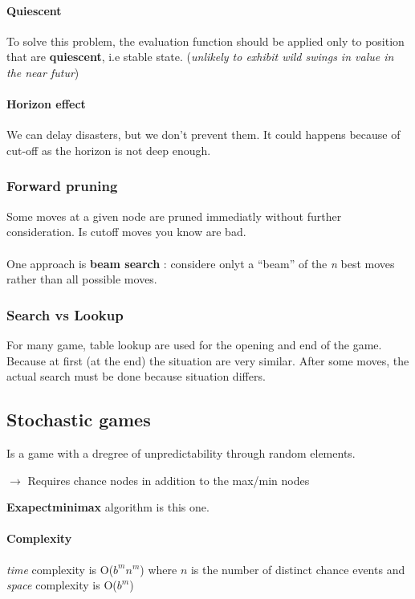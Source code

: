 \paragraph{Quiescent}  To solve  this problem,  the evaluation  function
should  be applied  only to  position that  are \textbf{quiescent},  i.e
stable state. (\textit{unlikely  to exhibit wild swings in  value in the
near futur})

\paragraph{Horizon effect} We can delay disasters, but we don't prevent them. It could happens because of
cut-off as the horizon is not deep enough.

\subsubsection{Forward pruning}
Some moves at a given node are pruned immediatly without further consideration.
Is cutoff moves you know are bad.

\paragraph{ } One approach is \textbf{beam search} : considere onlyt a ``beam'' of the 
\textit{n} best moves rather than all possible moves.


\subsubsection{Search vs Lookup}
For many game, table lookup are used for the opening and end of the game. Because at first (at the end) the 
situation are very similar. After some moves, the actual search must be done because situation differs. 



\subsection{Stochastic games}
Is a game with a dregree of unpredictability through random elements.

$\rightarrow$ Requires chance nodes in addition to the max/min nodes

\textbf{Exapectminimax} algorithm is this one.

\paragraph{Complexity} \textit{time} complexity is O($b^m n^m$) where $n$
is the number of distinct chance events and \textit{space} complexity is O($b^m$)

